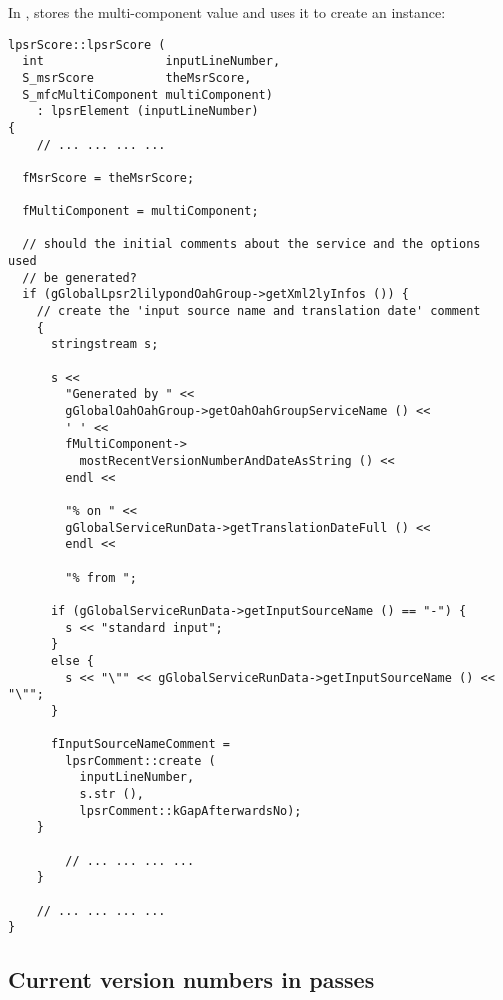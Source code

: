 In ,  stores the multi-component value and uses it to create an  instance:
\begin{lstlisting}[language=CPlusPlus]
lpsrScore::lpsrScore (
  int                 inputLineNumber,
  S_msrScore          theMsrScore,
  S_mfcMultiComponent multiComponent)
    : lpsrElement (inputLineNumber)
{
	// ... ... ... ...

  fMsrScore = theMsrScore;

  fMultiComponent = multiComponent;

  // should the initial comments about the service and the options used
  // be generated?
  if (gGlobalLpsr2lilypondOahGroup->getXml2lyInfos ()) {
    // create the 'input source name and translation date' comment
    {
      stringstream s;

      s <<
        "Generated by " <<
        gGlobalOahOahGroup->getOahOahGroupServiceName () <<
        ' ' <<
        fMultiComponent->
          mostRecentVersionNumberAndDateAsString () <<
        endl <<

        "% on " <<
        gGlobalServiceRunData->getTranslationDateFull () <<
        endl <<

        "% from ";

      if (gGlobalServiceRunData->getInputSourceName () == "-") {
        s << "standard input";
      }
      else {
        s << "\"" << gGlobalServiceRunData->getInputSourceName () << "\"";
      }

      fInputSourceNameComment =
        lpsrComment::create (
          inputLineNumber,
          s.str (),
          lpsrComment::kGapAfterwardsNo);
    }

	 	// ... ... ... ...
 	}

 	// ... ... ... ...
}
\end{lstlisting}


\subsection{Current version numbers in passes}\label{Current version numbers in passes}


